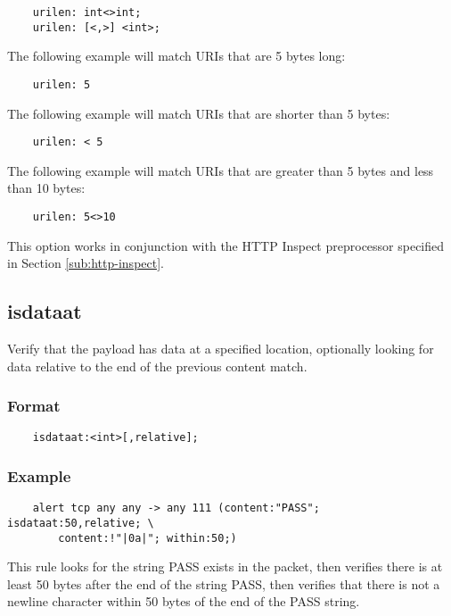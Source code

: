 \documentclass[english]{report}
\begin{document}
\begin{verbatim}
    urilen: int<>int;
    urilen: [<,>] <int>;
\end{verbatim}

The following example will match URIs that are 5 bytes long:

\begin{verbatim}
    urilen: 5
\end{verbatim}

The following example will match URIs that are shorter than 5 bytes:

\begin{verbatim}
    urilen: < 5
\end{verbatim}

The following example will match URIs that are greater than 5 bytes and less
than 10 bytes:

\begin{verbatim}
    urilen: 5<>10
\end{verbatim}

This option works in conjunction with the HTTP Inspect preprocessor specified
in Section \ref{sub:http-inspect}.

\subsection{isdataat}

Verify that the payload has data at a specified location, optionally looking
for data relative to the end of the previous content match.

\subsubsection{Format}

\begin{verbatim}
    isdataat:<int>[,relative];
\end{verbatim}

\subsubsection{Example}

\begin{verbatim}
    alert tcp any any -> any 111 (content:"PASS"; isdataat:50,relative; \ 
        content:!"|0a|"; within:50;)
\end{verbatim}

This rule looks for the string PASS exists in the packet, then verifies there
is at least 50 bytes after the end of the string PASS, then verifies that there
is not a newline character within 50 bytes of the end of the PASS string.
\end{document}
